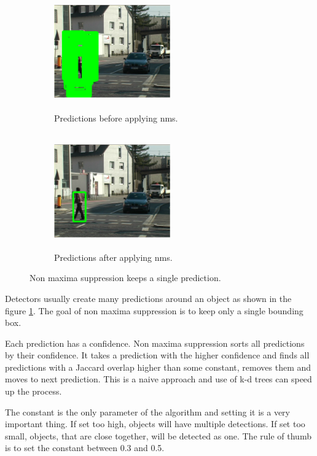 \documentclass[a4paper,12pt,titlepage, twoside]{article}
\numberwithin{figure}{section}
\begin{document}
\begin{figure}[h!]
	\begin{subfigure}[Sample1]{0.5\linewidth}
    	\includegraphics[height=50mm, width=50mm]{fig/nms1.png} 
        \caption{Predictions before applying nms.}
        \label{fig:nms1}   
    \end{subfigure}
    \quad
    \begin{subfigure}[Sample1]{0.5\linewidth} 
    	\includegraphics[height=50mm, width=50mm]{fig/nms2.png}
        \caption{Predictions after applying nms.}   
        \label{fig:nms2}
    \end{subfigure} 
\caption{Non maxima suppression\cite{diez2011non} keeps a single prediction.}
\label{fig:nms}
\end{figure}

Detectors usually create many predictions around an object as shown in the figure \ref{fig:nms1}. The goal of non maxima suppression is to keep only a single bounding box. 

Each prediction has a confidence. Non maxima suppression sorts all predictions by their confidence. It takes a prediction with the higher confidence and finds all predictions with a Jaccard overlap\cite{tan2005introduction} higher than some constant, removes them and moves to next prediction. This is a naive approach and use of k-d trees can speed up the process.

The constant is the only parameter of the algorithm and setting it is a very important thing. If set too high, objects will have multiple detections. If set too small, objects, that are close together, will be detected as one. The rule of thumb is to set the constant between 0.3 and 0.5.
\end{document}
